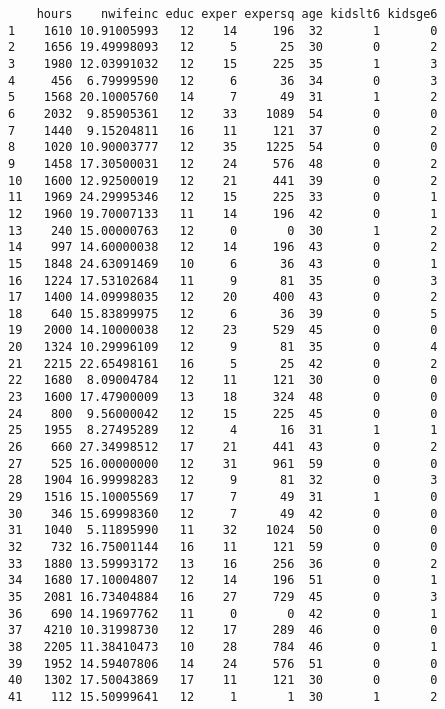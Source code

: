 \documentclass[
  letterpaper,
  DIV=11,
  numbers=noendperiod]{scrreprt}
\begin{document}
\begin{verbatim}
    hours    nwifeinc educ exper expersq age kidslt6 kidsge6
1    1610 10.91005993   12    14     196  32       1       0
2    1656 19.49998093   12     5      25  30       0       2
3    1980 12.03991032   12    15     225  35       1       3
4     456  6.79999590   12     6      36  34       0       3
5    1568 20.10005760   14     7      49  31       1       2
6    2032  9.85905361   12    33    1089  54       0       0
7    1440  9.15204811   16    11     121  37       0       2
8    1020 10.90003777   12    35    1225  54       0       0
9    1458 17.30500031   12    24     576  48       0       2
10   1600 12.92500019   12    21     441  39       0       2
11   1969 24.29995346   12    15     225  33       0       1
12   1960 19.70007133   11    14     196  42       0       1
13    240 15.00000763   12     0       0  30       1       2
14    997 14.60000038   12    14     196  43       0       2
15   1848 24.63091469   10     6      36  43       0       1
16   1224 17.53102684   11     9      81  35       0       3
17   1400 14.09998035   12    20     400  43       0       2
18    640 15.83899975   12     6      36  39       0       5
19   2000 14.10000038   12    23     529  45       0       0
20   1324 10.29996109   12     9      81  35       0       4
21   2215 22.65498161   16     5      25  42       0       2
22   1680  8.09004784   12    11     121  30       0       0
23   1600 17.47900009   13    18     324  48       0       0
24    800  9.56000042   12    15     225  45       0       0
25   1955  8.27495289   12     4      16  31       1       1
26    660 27.34998512   17    21     441  43       0       2
27    525 16.00000000   12    31     961  59       0       0
28   1904 16.99998283   12     9      81  32       0       3
29   1516 15.10005569   17     7      49  31       1       0
30    346 15.69998360   12     7      49  42       0       0
31   1040  5.11895990   11    32    1024  50       0       0
32    732 16.75001144   16    11     121  59       0       0
33   1880 13.59993172   13    16     256  36       0       2
34   1680 17.10004807   12    14     196  51       0       1
35   2081 16.73404884   16    27     729  45       0       3
36    690 14.19697762   11     0       0  42       0       1
37   4210 10.31998730   12    17     289  46       0       0
38   2205 11.38410473   10    28     784  46       0       1
39   1952 14.59407806   14    24     576  51       0       0
40   1302 17.50043869   17    11     121  30       0       0
41    112 15.50999641   12     1       1  30       1       2

\end{verbatim}
\end{document}
